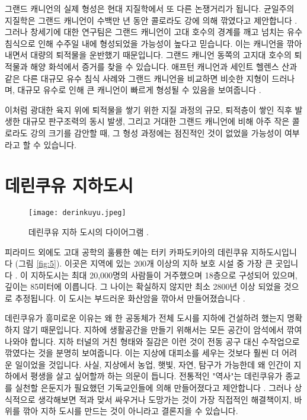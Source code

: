 \documentclass[10pt,twocolumn,letterpaper]{article}
\begin{document}
그랜드 캐니언의 실제 형성은 현대 지질학에서 또 다른 논쟁거리가 됩니다. 균일주의 지질학은 그랜드 캐니언이 수백만 년 동안 콜로라도 강에 의해 깎였다고 제안합니다 \cite{47}. 그러나 창세기에 대한 연구팀은 그랜드 캐니언이 고대 호수의 경계를 깨고 넘치는 유수 침식으로 인해 수주일 내에 형성되었을 가능성이 높다고 믿습니다. 이는 캐니언을 깎아내면서 대량의 퇴적물을 운반했기 때문입니다. 그랜드 캐니언 동쪽의 고지대 호수의 퇴적물과 해양 화석에서 증거를 찾을 수 있습니다. 애프턴 캐니언과 세인트 헬렌스 산과 같은 다른 대규모 유수 침식 사례와 그랜드 캐니언을 비교하면 비슷한 지형이 드러나며, 대규모 유수로 인해 큰 캐니언이 빠르게 형성될 수 있음을 보여줍니다 \cite{48}.

이처럼 광대한 육지 위에 퇴적물을 쌓기 위한 지질 과정의 규모, 퇴적층이 쌓인 직후 발생한 대규모 판구조력의 동시 발생, 그리고 거대한 그랜드 캐니언에 비해 아주 작은 콜로라도 강의 크기를 감안할 때, 그 형성 과정에는 점진적인 것이 없었을 가능성이 여부라고 할 수 있습니다.

\section{데린쿠유 지하도시}

\begin{figure}[b]
\begin{center}
   \texttt{[image: derinkuyu.jpeg]}
\end{center}
   \caption{데린쿠유 지하 도시의 다이어그램 \cite{56}.}
\label{fig:5}
\label{fig:onecol}
\end{figure}

피라미드 외에도 고대 공학의 훌륭한 예는 터키 카파도키아의 데린쿠유 지하도시입니다 (그림 \ref{fig:5}). 이곳은 지역에 있는 200개 이상의 지하 보호 시설 중 가장 큰 곳입니다 \cite{54}. 이 지하도시는 최대 20,000명의 사람들이 거주했으며 18층으로 구성되어 있으며, 깊이는 85미터에 이릅니다. 그 나이는 확실하지 않지만 최소 2800년 이상 되었을 것으로 추정됩니다. 이 도시는 부드러운 화산암을 깎아서 만들어졌습니다 \cite{52, 53}.

데린쿠유가 흥미로운 이유는 왜 한 공동체가 전체 도시를 지하에 건설하려 했는지 명확하지 않기 때문입니다. 지하에 생활공간을 만들기 위해서는 모든 공간이 암석에서 깎여 나와야 합니다. 지하 터널의 거친 형태와 질감은 이런 것이 전동 공구 대신 수작업으로 깎였다는 것을 분명히 보여줍니다. 이는 지상에 대피소를 세우는 것보다 훨씬 더 어려운 일이었을 것입니다. 사실, 지상에서 농업, 햇빛, 자연, 탐구가 가능한데 왜 인간이 지하에서 평생을 살고 싶어할까 하는 의문이 듭니다. 전통적인 "역사"는 데린쿠유가 종교를 실천할 은둔지가 필요했던 기독교인들에 의해 만들어졌다고 제안합니다 \cite{53}. 그러나 상식적으로 생각해보면 적과 맞서 싸우거나 도망가는 것이 가장 직접적인 해결책이지, 바위를 깎아 지하 도시를 만드는 것이 아니라고 결론지을 수 있습니다.
\end{document}
